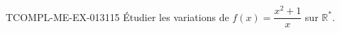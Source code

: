 \begin{exercice}{TCOMPL-ME-EX-013}{1}{15}
Étudier les variations de $f(x) = \dfrac{x^2+1}{x}$ sur $\mathbb{R}^*$.

\end{exercice}
